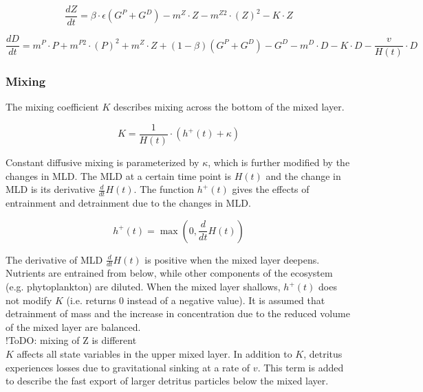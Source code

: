 \documentclass[template.tex]{subfiles}
\begin{document}
\begin{equation}
    \frac{d Z}{d t} =
    \beta \cdot \epsilon(G^P + G^D) %
    - m^Z \cdot Z %
    - m^{Z2} \cdot (Z)^2 %
    - K \cdot Z %
\end{equation}

\begin{equation}
    \frac{d D}{d t} = 
    m^P \cdot P %
    + m^{P2} \cdot (P)^2 %
    + m^Z \cdot Z %
    + (1 - \beta)(G^P + G^D) %
    - G^D %
    - m^D \cdot D %
    - K \cdot D %
    - \frac{v}{H(t)} \cdot D %
\end{equation}



\subsubsection{Mixing}

The mixing coefficient $K$ describes mixing across the bottom of the mixed layer.

\begin{equation}
    K = \frac{1}{H(t)} \cdot \left(h^{+}(t) + \kappa\right)
\end{equation}

Constant diffusive mixing is parameterized by $\kappa$, which is further modified by the changes in MLD. The MLD at a certain time point is $H(t)$ and the change in MLD is its derivative $\frac{d}{d t} H(t)$. The function $h^{+}(t)$ gives the effects of entrainment and detrainment due to the changes in MLD.

\begin{equation}
    h^{+}(t) = \max\left(0, \frac{d}{d t} H(t)\right)
\end{equation}

The derivative of MLD $\frac{d}{d t} H(t)$ is positive when the mixed layer deepens. Nutrients are entrained from below, while other components of the ecosystem (e.g. phytoplankton) are diluted. When the mixed layer shallows, $h^{+}(t)$ does not modify $K$ (i.e. returns 0 instead of a negative value). It is assumed that detrainment of mass and the increase in concentration due to the reduced volume of the mixed layer are balanced.
\\ !ToDO: mixing of Z is different \\
$K$ affects all state variables in the upper mixed layer. In addition to $K$, detritus experiences losses due to gravitational sinking at a rate of $v$. This term is added to describe the fast export of larger detritus particles below the mixed layer. 
\end{document}
